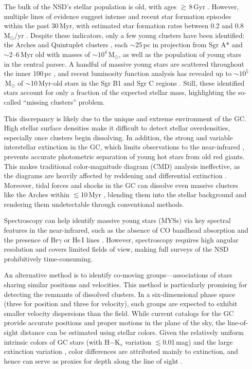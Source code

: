\documentclass{aa} %
\begin{document}
	The bulk of the NSD's stellar population is old, with ages $\gtrsim$\,8\,Gyr \citep{Paco_sfh}. However, multiple lines of evidence suggest intense and recent star formation episodes within the past 30\,Myr, with estimated star formation rates between 0.2 and 0.8\,M$_\odot$/yr \citep{three_cepheids, paco_nature_2020}. Despite these indicators, only a few young clusters have been identified: the Arches and Quintuplet clusters \citep{Bartko_2010, Lu_2013}, each $\sim$25\,pc in projection from Sgr A* and $\sim$2–6\,Myr old with masses of $\sim10^4$\,M$_\odot$, as well as the population of young stars in the central parsec. A handful of massive young stars are scattered throughout the inner 100\,pc \citep[e.g.][]{Massive_stars, Cano, Clark_2023}, and recent luminosity function analysis has revealed up to $\sim10^5$\,M$_\odot$ of $\sim$10\,Myr-old stars in the Sgr B1 and Sgr C regions \citep{Paco_B1, Paco_SgrC}. Still, these identified stars account for only a fraction of the expected stellar mass, highlighting the so-called ``missing clusters'' problem.
	
	This discrepancy is likely due to the unique and extreme environment of the GC. High stellar surface densities make it difficult to detect stellar overdensities, especially once clusters begin dissolving. In addition, the strong and variable interstellar extinction in the GC, which limits observations to the near-infrared \citep{extinction_los, paco_exctinction}, prevents accurate photometric separation of young hot stars from old red giants. This makes traditional color-magnitude diagram (CMD) analysis ineffective, as the diagrams are heavily affected by reddening and differential extinction \citep{GNSI}. Moreover, tidal forces and shocks in the GC can dissolve even massive clusters like the Arches within $\lesssim$10\,Myr \citep{dissolve_GC, cluster_dissolution}, blending them into the stellar background and rendering them undetectable through conventional methods.
	
	Spectroscopy can help identify massive young stars (MYSs) via key spectral features in the near-infrared, such as the absence of CO bandhead absorption and the presence of Br$\gamma$ or He\,I lines \citep{spec_class_1, spec_class_2}. However, spectroscopy requires high angular resolution and covers limited fields of view, making full surveys of the NSD prohibitively time-consuming.
	
	An alternative method is to identify co-moving groups—associations of stars sharing similar positions and velocities. This method is particularly promising for detecting the remnants of dissolved clusters. In a six-dimensional phase space (three for position and three for velocity), such groups are expected to exhibit smaller velocity dispersions than the field. While current catalogs for the GC provide accurate positions and proper motions in the plane of the sky, the line-of-sight distance can be estimated using stellar colors. Given the relatively uniform intrinsic colors of GC stars (with H$-$K$_s$ variation $\lesssim$0.01\,mag) and the large extinction variation \citep{GNSI, GNSIV, Ban_catalog, paco_NSD}, color differences are attributed mainly to extinction, and hence can serve as proxies for depth along the line of sight \citep{paco_NSD}.
	
\end{document}
